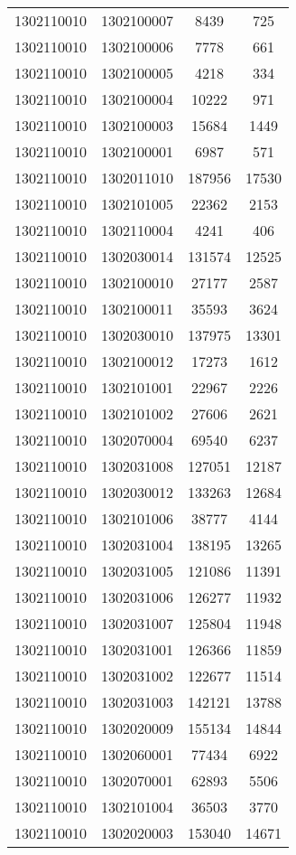 \begin{longtable}{llcc}
1302110010 & 1302100007 & 8439 & 725\\
1302110010 & 1302100006 & 7778 & 661\\
1302110010 & 1302100005 & 4218 & 334\\
1302110010 & 1302100004 & 10222 & 971\\
1302110010 & 1302100003 & 15684 & 1449\\
1302110010 & 1302100001 & 6987 & 571\\
1302110010 & 1302011010 & 187956 & 17530\\
1302110010 & 1302101005 & 22362 & 2153\\
1302110010 & 1302110004 & 4241 & 406\\
1302110010 & 1302030014 & 131574 & 12525\\
1302110010 & 1302100010 & 27177 & 2587\\
1302110010 & 1302100011 & 35593 & 3624\\
1302110010 & 1302030010 & 137975 & 13301\\
1302110010 & 1302100012 & 17273 & 1612\\
1302110010 & 1302101001 & 22967 & 2226\\
1302110010 & 1302101002 & 27606 & 2621\\
1302110010 & 1302070004 & 69540 & 6237\\
1302110010 & 1302031008 & 127051 & 12187\\
1302110010 & 1302030012 & 133263 & 12684\\
1302110010 & 1302101006 & 38777 & 4144\\
1302110010 & 1302031004 & 138195 & 13265\\
1302110010 & 1302031005 & 121086 & 11391\\
1302110010 & 1302031006 & 126277 & 11932\\
1302110010 & 1302031007 & 125804 & 11948\\
1302110010 & 1302031001 & 126366 & 11859\\
1302110010 & 1302031002 & 122677 & 11514\\
1302110010 & 1302031003 & 142121 & 13788\\
1302110010 & 1302020009 & 155134 & 14844\\
1302110010 & 1302060001 & 77434 & 6922\\
1302110010 & 1302070001 & 62893 & 5506\\
1302110010 & 1302101004 & 36503 & 3770\\
1302110010 & 1302020003 & 153040 & 14671\\

\end{longtable}
